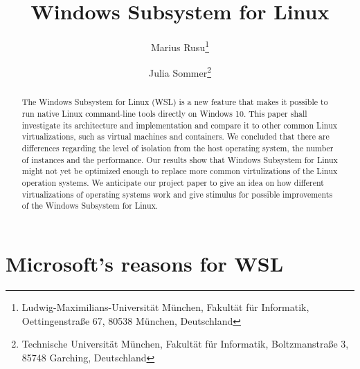 \documentclass[utf8,biblatex, ngerman, english]{lni}
\begin{document}
\title[WSL]{Windows Subsystem for Linux}
\author[Marius Rusu \and Julia Sommer]
{Marius Rusu\footnote{Ludwig-Maximilians-Universität München, Fakultät für Informatik, Oettingenstraße 67, 80538 München, Deutschland } \and
 Julia Sommer\footnote{Technische Universität München, Fakultät für Informatik, Boltzmanstraße 3, 85748 Garching, Deutschland }}
\maketitle
\newpage
\newpage

\begin{abstract}
The Windows Subsystem for Linux (WSL) is a new feature that makes it possible to run native Linux command-line tools directly on Windows 10. This paper shall investigate its architecture and implementation and compare it to other common Linux virtualizations, such as virtual machines and containers. We concluded that there are differences regarding the level of isolation from the host operating system, the number of instances and the performance. Our results show that Windows Subsystem for Linux might not yet be optimized enough to replace more common virtulizations of the Linux operation systems. We anticipate our project paper to give an idea on how different virtualizations of operating systems work and give stimulus for possible improvements of the Windows Subsystem for Linux. 
\end{abstract}


\section{Microsoft's reasons for WSL}
\end{document}
